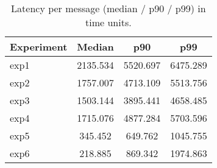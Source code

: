 \begin{table}[h]
\centering
\caption{Latency per message (median / p90 / p99) in time units.}
\label{tab:latency}
\begin{tabular}{lccc}
\toprule
Experiment & Median & p90 & p99 \\
\midrule
exp1 & 2135.534 & 5520.697 & 6475.289 \\
exp2 & 1757.007 & 4713.109 & 5513.756 \\
exp3 & 1503.144 & 3895.441 & 4658.485 \\
exp4 & 1715.076 & 4877.284 & 5703.596 \\
exp5 & 345.452 & 649.762 & 1045.755 \\
exp6 & 218.885 & 869.342 & 1974.863 \\
\bottomrule
\end{tabular}
\end{table}